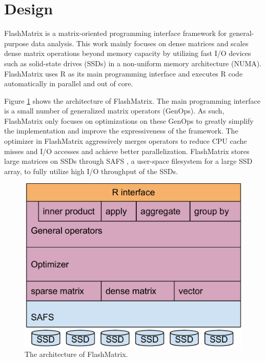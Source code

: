 \section{Design}

FlashMatrix is a matrix-oriented programming interface framework for
general-purpose data analysis. This work mainly focuses on dense matrices and scales
dense matrix operations beyond memory capacity by utilizing fast I/O devices
such as solid-state drives (SSDs) in a non-uniform memory architecture (NUMA).
FlashMatrix uses R as its main programming interface and executes R code
automatically in parallel and out of core.

Figure \ref{fig:arch} shows the architecture of FlashMatrix. The main programming
interface is a small number of generalized matrix operators (GenOps). As such,
FlashMatrix only focuses on optimizations on these GenOps
to greatly simplify the implementation and improve the expressiveness of
the framework. The optimizer in FlashMatrix aggressively merges operators to
reduce CPU cache misses and I/O accesses and achieve better parallelization.
FlashMatrix stores large matrices on SSDs through SAFS \cite{safs},
a user-space filesystem for a large SSD array, to fully utilize high I/O
throughput of the SSDs.

\begin{figure}
\centering
\includegraphics[scale=0.3]{./architecture.pdf}
\caption{The architecture of FlashMatrix.}
\label{fig:arch}
\end{figure}

